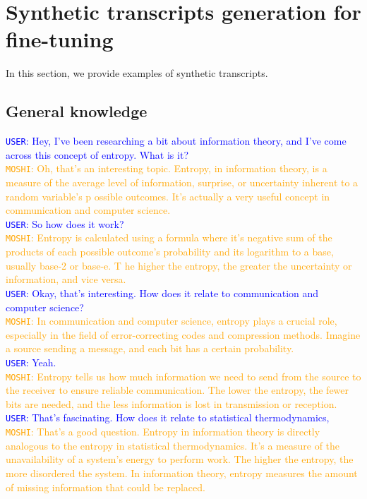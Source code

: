 \newpage
\section{Synthetic transcripts generation for fine-tuning}
In this section, we provide examples of synthetic transcripts.

\subsection{General knowledge}


\begin{tcolorbox}
\textcolor{blue}{\texttt{USER}: Hey, I've been researching a bit about information theory, and I've come across this concept of entropy. What is it?} \\
\textcolor{orange}{\texttt{MOSHI}: Oh, that's an interesting topic. Entropy, in information theory, is a measure of the average level of information, surprise, or uncertainty inherent to a random variable's p
ossible outcomes. It's actually a very useful concept in communication and computer science.} \\
\textcolor{blue}{\texttt{USER}: So how does it work?} \\
\textcolor{orange}{\texttt{MOSHI}: Entropy is calculated using a formula where it's negative sum of the products of each possible outcome's probability and its logarithm to a base, usually base-2 or base-e. T
he higher the entropy, the greater the uncertainty or information, and vice versa.} \\
\textcolor{blue}{\texttt{USER}: Okay, that's interesting. How does it relate to communication and computer science?} \\
\textcolor{orange}{\texttt{MOSHI}: In communication and computer science, entropy plays a crucial role, especially in the field of error-correcting codes and compression methods. Imagine a source sending a message, and each bit has a certain probability.} \\
\textcolor{blue}{\texttt{USER}: Yeah.} \\
\textcolor{orange}{\texttt{MOSHI}: Entropy tells us how much information we need to send from the source to the receiver to ensure reliable communication. The lower the entropy, the fewer bits are needed, and the less information is lost in transmission or reception.} \\
\textcolor{blue}{\texttt{USER}: That's fascinating. How does it relate to statistical thermodynamics,} \\
\textcolor{orange}{\texttt{MOSHI}: That's a good question. Entropy in information theory is directly analogous to the entropy in statistical thermodynamics. It's a measure of the unavailability of a system's energy to perform work. The higher the entropy, the more disordered the system. In information theory, entropy measures the amount of missing information that could be replaced.} \\

\end{tcolorbox}
